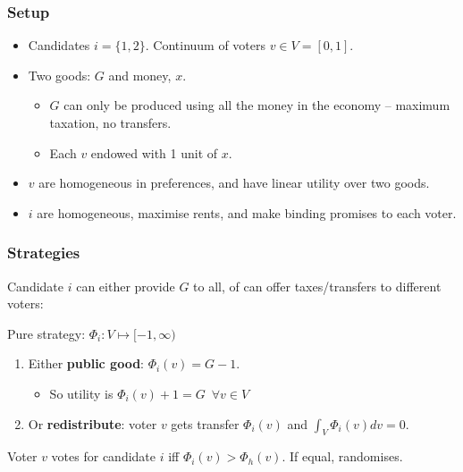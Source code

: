 \documentclass[11pt,aspectratio=169]{beamer}
\begin{document}
\begin{frame}
\frametitle{Setup}

\begin{itemize}
\item Candidates $i=\{1,2\}$. Continuum of voters $v\in V= [0,1]$.
\item Two goods: $G$ and money, $x$.
\begin{itemize}
\item $G$ can only be produced using all the money in the economy -- maximum taxation, no transfers.
\item Each $v$ endowed with 1 unit of $x$.
\end{itemize}
\item $v$ are homogeneous in preferences, and have linear utility over two goods.
\item $i$ are homogeneous, maximise rents, and make binding promises to each voter.
\end{itemize}

\end{frame}


\begin{frame}
\frametitle{Strategies}

Candidate $i$ can either provide $G$ to all, of can offer taxes/transfers to different voters:

Pure strategy: $\Phi_i : V \mapsto [-1,\infty)$
\begin{enumerate}

\item Either \textbf{public good}: $\Phi_i (v) = G-1$. 
\begin{itemize}
\item So utility is $\Phi_i(v) + 1 = G \, \, \, \forall v \in V$
\end{itemize}
\item Or \textbf{redistribute}: voter $v$ gets transfer $\Phi_i(v)$ and $\int_V \Phi_i (v) dv=0$.
\end{enumerate}


\bigskip 

Voter $v$ votes for candidate $i$ iff $\Phi_i(v) > \Phi_h(v)$. If equal, randomises.

\end{frame}
\end{document}

